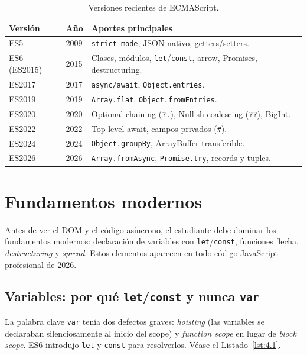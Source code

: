 \documentclass[11pt,a4paper,openany]{book}
\begin{document}
\begin{table}[htbp]
\centering
\caption{Versiones recientes de ECMAScript.}
\footnotesize
\begin{tabularx}{\textwidth}{lXX}
\toprule
\textbf{Versión} & \textbf{Año} & \textbf{Aportes principales}\\
\midrule
ES5  & 2009 & \texttt{strict mode}, JSON nativo, getters/setters.\\
ES6 (ES2015) & 2015 & Clases, módulos, \texttt{let}/\texttt{const}, arrow, Promises, destructuring.\\
ES2017 & 2017 & \texttt{async/await}, \texttt{Object.entries}.\\
ES2019 & 2019 & \texttt{Array.flat}, \texttt{Object.fromEntries}.\\
ES2020 & 2020 & Optional chaining (\texttt{?.}), Nullish coalescing (\texttt{??}), BigInt.\\
ES2022 & 2022 & Top-level await, campos privados (\texttt{\#}).\\
ES2024 & 2024 & \texttt{Object.groupBy}, ArrayBuffer transferible.\\
ES2026 \cite{ecma2024} & 2026 & \texttt{Array.fromAsync}, \texttt{Promise.try}, records y tuples.\\
\bottomrule
\end{tabularx}
\end{table}

\section{Fundamentos modernos}

Antes de ver el DOM y el código asíncrono, el estudiante debe
dominar los fundamentos modernos: declaración de variables con
\texttt{let}/\texttt{const}, funciones flecha, \emph{destructuring}
y \emph{spread}. Estos elementos aparecen en todo código JavaScript
profesional de 2026.


\subsection{Variables: por qué \texttt{let}/\texttt{const} y nunca \texttt{var}}

La palabra clave \texttt{var} tenía dos defectos graves:
\emph{hoisting} (las variables se declaraban silenciosamente al
inicio del scope) y \emph{function scope} en lugar de \emph{block
scope}. ES6 introdujo \texttt{let} y \texttt{const} para resolverlos. V\'ease el Listado~\ref{lst:4.1}.
\end{document}
